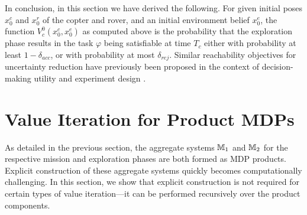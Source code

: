 \documentclass[conference]{IEEEtran}
\renewcommand{\cite}[1]{\citep{#1}}
\begin{document}
In conclusion, in this section we have derived the following. For given initial poses $x^c_0$ and $x^r_0$ of the copter and rover, and an initial environment belief $x^e_0$, the function $V^0_c(x^c_0, x^e_0)$ as computed above is the probability that the exploration phase results in the task $\varphi$ being satisfiable at time $T_c$ either with probability at least $1- \delta_{acc}$, or with probability at most $\delta_{rej}$. Similar reachability objectives for uncertainty reduction have previously been proposed in the context of decision-making utility \cite{lindley2000philosophy} and experiment design \cite{haesaert2016experiment}.


\section{ Value Iteration for Product MDPs}
\label{sec:valueiter}

As detailed in the previous section, the aggregate systems $\mathbb{M}_1$ and $\mathbb{M}_2$ for the respective mission and exploration phases are both formed as MDP products. Explicit construction of these aggregate systems quickly becomes computationally challenging. In this section, we show that explicit construction is not required for certain types of value iteration---it can be performed recursively over the product components.
\end{document}
